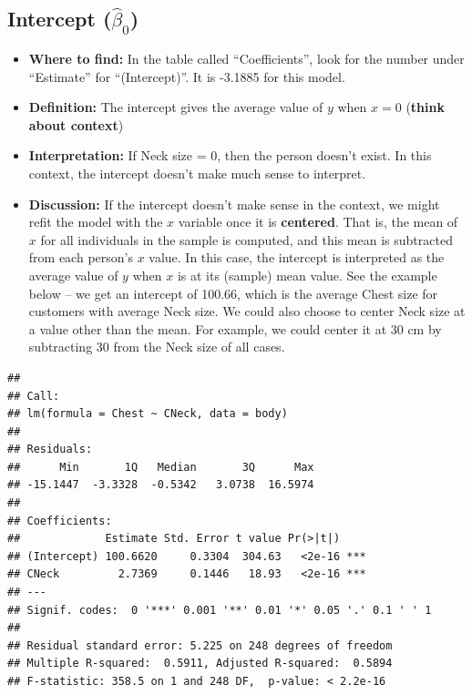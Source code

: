 \documentclass[
]{book}
\newenvironment{Shaded}{\begin{snugshade}}{\end{snugshade}}
\newcommand{\DataTypeTok}[1]{\textcolor[rgb]{0.13,0.29,0.53}{#1}}
\newcommand{\KeywordTok}[1]{\textcolor[rgb]{0.13,0.29,0.53}{\textbf{#1}}}
\newcommand{\NormalTok}[1]{#1}
\newcommand{\OperatorTok}[1]{\textcolor[rgb]{0.81,0.36,0.00}{\textbf{#1}}}
\newcommand{\StringTok}[1]{\textcolor[rgb]{0.31,0.60,0.02}{#1}}
\providecommand{\tightlist}{%
  \setlength{\itemsep}{0pt}\setlength{\parskip}{0pt}}
\begin{document}
\hypertarget{intercept-hatbeta_0}{%
\subsection{\texorpdfstring{Intercept (\(\hat{\beta}_0\))}{Intercept (\textbackslash hat\{\textbackslash beta\}\_0)}}\label{intercept-hatbeta_0}}

\begin{itemize}
\tightlist
\item
  \textbf{Where to find:} In the table called ``Coefficients'', look for the number under ``Estimate'' for ``(Intercept)''. It is -3.1885 for this model.
\item
  \textbf{Definition:} The intercept gives the average value of \(y\) when \(x=0\) (\textbf{think about context})
\item
  \textbf{Interpretation:} If Neck size = 0, then the person doesn't exist. In this context, the intercept doesn't make much sense to interpret.
\item
  \textbf{Discussion:} If the intercept doesn't make sense in the context, we might refit the model with the \(x\) variable once it is \textbf{centered}. That is, the mean of \(x\) for all individuals in the sample is computed, and this mean is subtracted from each person's \(x\) value. In this case, the intercept is interpreted as the average value of \(y\) when \(x\) is at its (sample) mean value. See the example below -- we get an intercept of 100.66, which is the average Chest size for customers with average Neck size. We could also choose to center Neck size at a value other than the mean. For example, we could center it at 30 cm by subtracting 30 from the Neck size of all cases.
\end{itemize}

\begin{Shaded}
\end{Shaded}

\begin{verbatim}
## 
## Call:
## lm(formula = Chest ~ CNeck, data = body)
## 
## Residuals:
##      Min       1Q   Median       3Q      Max 
## -15.1447  -3.3328  -0.5342   3.0738  16.5974 
## 
## Coefficients:
##             Estimate Std. Error t value Pr(>|t|)    
## (Intercept) 100.6620     0.3304  304.63   <2e-16 ***
## CNeck         2.7369     0.1446   18.93   <2e-16 ***
## ---
## Signif. codes:  0 '***' 0.001 '**' 0.01 '*' 0.05 '.' 0.1 ' ' 1
## 
## Residual standard error: 5.225 on 248 degrees of freedom
## Multiple R-squared:  0.5911,	Adjusted R-squared:  0.5894 
## F-statistic: 358.5 on 1 and 248 DF,  p-value: < 2.2e-16
\end{verbatim}
\end{document}

